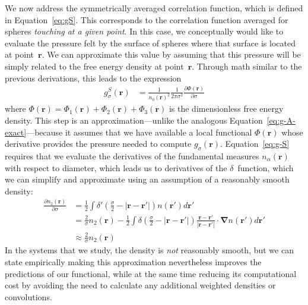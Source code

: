 \documentclass[letterpaper,twocolumn,amsmath,amssymb,jcp,10pt,aip]{revtex4-1}
\newcommand{\rr}{\textbf{r}}
\begin{document}
We now address the symmetrically averaged correlation function, which
is defined in Equation~\ref{eq:gS}.  This corresponds to the
correlation function averaged for spheres \emph{touching at a given
  point}.  In this case, we conceptually would like to evaluate the
pressure felt by the surface of spheres where that surface is located
at point~$\rr$.  We can approximate this value by assuming that this
pressure will be simply related to the free energy density at
point~$\rr$.  Through math similar to the previous derivations, this
leads to the expression
\begin{align}
  g_\sigma^S(\rr)%
  &= \frac{1}{n_0(\rr)^2}\frac{1}{ 2\pi \sigma^2}
  \frac{\partial \Phi(\rr)}{\partial \sigma} \label{eq:g-S}
\end{align}
where $\Phi(\rr) = \Phi_1(\rr) + \Phi_2(\rr) + \Phi_3(\rr)$ is the
dimensionless free energy density.  This step is an
approximation---unlike the analogous
Equation~\ref{eq:g-A-exact}---because it assumes that we have
available a local functional $\Phi(\rr)$ whose derivative provides the
pressure needed to compute $g_\sigma(\rr)$.  Equation~\ref{eq:g-S}
requires that we evaluate the derivatives of the fundamental measures
$n_\alpha(\rr)$ with respect to diameter, which leads us to
derivatives of the $\delta$~function, which we can simplify and
approximate using an assumption of a reasonably smooth density:
\begin{align}
  \frac{\partial n_2(\rr)}{\partial \sigma}
  &= \frac12 \int \delta'(\frac\sigma2 - |\rr-\rr'|) n(\rr')d\rr' \\
  &= \frac2{\sigma}n_2(\rr) - \frac12 \int \delta\left(\frac\sigma2 - |\rr-\rr'|\right)
  \frac{\rr-\rr'}{|\rr-\rr'|}\cdot\mathbf{\nabla}n(\rr')d\rr' \\
  &\approx \frac{2}{\sigma}n_2(\rr)
\end{align}
In the systems that we study, the density is \emph{not} reasonably
smooth, but we can state empirically making this approximation
nevertheless improves the predictions of our functional, while at the
same time reducing its computational cost by avoiding the need to
calculate any additional weighted densities or convolutions.
\end{document}
